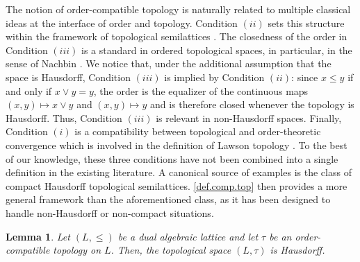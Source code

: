 \documentclass{article}
\newcommand{\red}{\color{red}}
\newtheorem{lemma}[theorem]{Lemma}
\begin{document}
The notion of order-compatible topology is naturally related to multiple classical ideas at the interface of order and topology. Condition \((ii)\) sets this structure within the framework of topological semilattices \cite{Gierz2003}. The closedness of the order in Condition \((iii)\) is a standard in ordered topological spaces, in particular, in the sense of Nachbin \cite{NachbinLeopoldo1965Tao}. We notice that, under the additional assumption that the space is Hausdorff, Condition \((iii)\) is implied by Condition \((ii)\): since \(x\leq y\) if and only if \(x\vee y=y\), the order is the equalizer of the continuous maps \((x,y)\mapsto x\vee y\) and \((x,y)\mapsto y\) and is therefore closed whenever the topology is Hausdorff. Thus, Condition \((iii)\) is relevant in non-Hausdorff spaces. Finally, Condition \((i)\) is a compatibility between topological and order-theoretic convergence which is involved in the definition of  Lawson topology \cite{Gierz2003}.
To the best of our knowledge, these three conditions have not been combined into a single definition in the existing literature. A canonical source of examples is the class of compact Hausdorff topological semilattices. \cref{def.comp.top} then provides a more general framework than the aforementioned class, as it has been designed to handle non-Hausdorff or non-compact situations. 

\begin{lemma}
Let \((L,\leq)\) be a dual algebraic lattice and let \(\tau\) be an order-compatible topology on $L$. Then, the topological space $(L,\tau)$ is Hausdorff.
\end{lemma}
\end{document}
